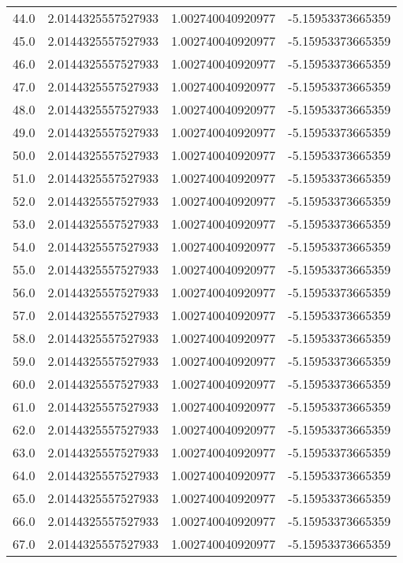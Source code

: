 \begin{longtable}{lrrr}
44.0 & 2.0144325557527933 & 1.002740040920977 & -5.15953373665359 \\
45.0 & 2.0144325557527933 & 1.002740040920977 & -5.15953373665359 \\
46.0 & 2.0144325557527933 & 1.002740040920977 & -5.15953373665359 \\
47.0 & 2.0144325557527933 & 1.002740040920977 & -5.15953373665359 \\
48.0 & 2.0144325557527933 & 1.002740040920977 & -5.15953373665359 \\
49.0 & 2.0144325557527933 & 1.002740040920977 & -5.15953373665359 \\
50.0 & 2.0144325557527933 & 1.002740040920977 & -5.15953373665359 \\
51.0 & 2.0144325557527933 & 1.002740040920977 & -5.15953373665359 \\
52.0 & 2.0144325557527933 & 1.002740040920977 & -5.15953373665359 \\
53.0 & 2.0144325557527933 & 1.002740040920977 & -5.15953373665359 \\
54.0 & 2.0144325557527933 & 1.002740040920977 & -5.15953373665359 \\
55.0 & 2.0144325557527933 & 1.002740040920977 & -5.15953373665359 \\
56.0 & 2.0144325557527933 & 1.002740040920977 & -5.15953373665359 \\
57.0 & 2.0144325557527933 & 1.002740040920977 & -5.15953373665359 \\
58.0 & 2.0144325557527933 & 1.002740040920977 & -5.15953373665359 \\
59.0 & 2.0144325557527933 & 1.002740040920977 & -5.15953373665359 \\
60.0 & 2.0144325557527933 & 1.002740040920977 & -5.15953373665359 \\
61.0 & 2.0144325557527933 & 1.002740040920977 & -5.15953373665359 \\
62.0 & 2.0144325557527933 & 1.002740040920977 & -5.15953373665359 \\
63.0 & 2.0144325557527933 & 1.002740040920977 & -5.15953373665359 \\
64.0 & 2.0144325557527933 & 1.002740040920977 & -5.15953373665359 \\
65.0 & 2.0144325557527933 & 1.002740040920977 & -5.15953373665359 \\
66.0 & 2.0144325557527933 & 1.002740040920977 & -5.15953373665359 \\
67.0 & 2.0144325557527933 & 1.002740040920977 & -5.15953373665359 \\

\end{longtable}
